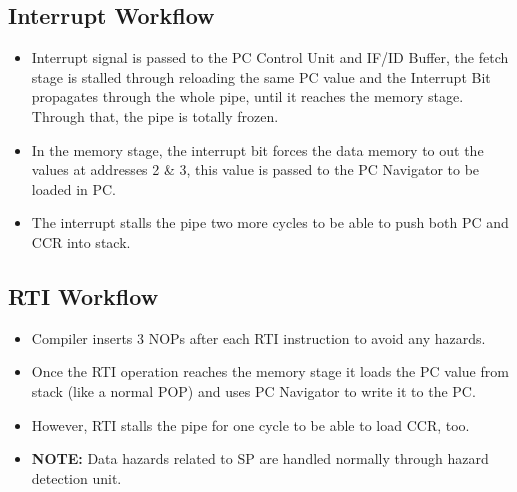 \subsection{Interrupt Workflow}
\begin{itemize}
    \item Interrupt signal is passed to the PC Control Unit and IF/ID Buffer, the fetch stage is stalled through reloading the same PC value and the Interrupt Bit propagates through the whole pipe, until it reaches the memory stage. Through that, the pipe is totally frozen.
    \item In the memory stage, the interrupt bit forces the data memory to out the values at addresses 2 \& 3, this value is passed to the PC Navigator to be loaded in PC.
    \item The interrupt stalls the pipe two more cycles to be able to push both PC and CCR into stack.
\end{itemize}

\subsection{RTI Workflow}
\begin{itemize}
    \item Compiler inserts 3 NOPs after each RTI instruction to avoid any hazards.
    \item  Once the RTI operation reaches the memory stage it loads the PC value from stack (like a normal POP) and uses PC Navigator to write it to the PC.
    \item However, RTI stalls the pipe for one cycle to be able to load CCR, too.
    \item \textbf{NOTE:} Data hazards related to SP are handled normally through hazard detection unit.
\end{itemize}